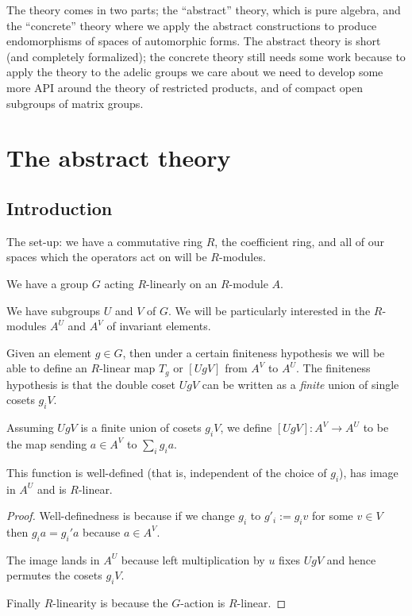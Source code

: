 The theory comes in two parts;
the ``abstract'' theory, which is pure algebra, and the ``concrete'' theory
where we apply the abstract constructions to produce endomorphisms of
spaces of automorphic forms. The abstract theory is short (and completely formalized);
the concrete theory still needs some work because to apply the theory to the
adelic groups we care about we need to develop some more API around the theory
of restricted products, and of compact open subgroups of matrix groups.

\section{The abstract theory}

\subsection{Introduction}

The set-up: we have a commutative ring $R$, the coefficient ring, and
all of our spaces which the operators act on will be $R$-modules.

We have a group $G$ acting $R$-linearly on an $R$-module $A$.

We have subgroups $U$ and $V$ of $G$.
We will be particularly interested in the $R$-modules $A^U$ and $A^V$
of invariant elements.

Given an element $g\in G$, then under a certain finiteness hypothesis
we will be able to define an $R$-linear map $T_g$ or $[UgV]$
from $A^V$ to $A^U$. The finiteness hypothesis is that the
double coset $UgV$ can be written as a \emph{finite} union of single
cosets $g_iV$.

\begin{definition}
  \label{AbstractHeckeOperator.HeckeOperatorToFun}
  \leanok
  Assuming $UgV$ is a finite union of cosets $g_iV$,
  we define $[UgV]:A^V\to A^U$ to be the map sending $a\in A^V$
  to $\sum_i g_ia.$
\end{definition}

\begin{lemma}
  \label{AbstractHeckeOperator.HeckeOperator}
  \leanok
  This function is well-defined (that is, independent of the
  choice of $g_i$), has image in $A^U$ and is $R$-linear.
\end{lemma}
\begin{proof}
  \leanok
  Well-definedness is because if we change $g_i$ to $g'_i:=g_iv$
  for some $v\in V$ then $g_ia=g_i'a$ because $a\in A^V$.

  The image lands in $A^U$ because left multiplication by $u$
  fixes $UgV$ and hence permutes the cosets $g_iV$.

  Finally $R$-linearity is because the $G$-action is $R$-linear.
\end{proof}

